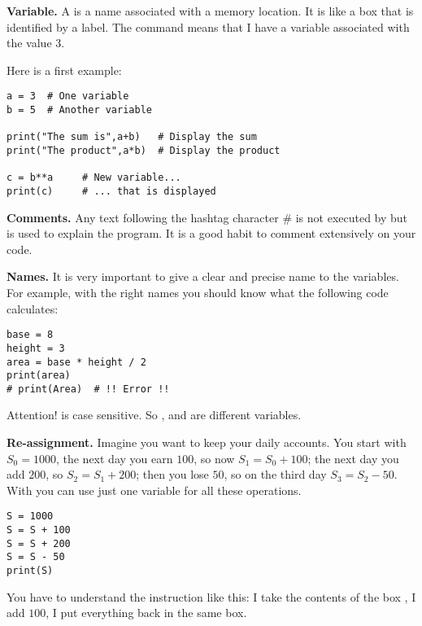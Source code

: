 \documentclass[11pt,class=report,crop=false]{standalone}
\begin{document}

\begin{cours}[Variables]


\textbf{Variable.} 
A  is a name associated with a memory location. It is like a box that is identified by a label.
The command \og{}\fg{} means that I have a variable \og{}\fg{} associated with the value $3$. 

Here is a first example:
\begin{lstlisting}
a = 3  # One variable
b = 5  # Another variable

print("The sum is",a+b)   # Display the sum
print("The product",a*b)  # Display the product

c = b**a     # New variable...
print(c)     # ... that is displayed
\end{lstlisting}


\medskip

\textbf{Comments.}
Any text following the hashtag character \og{}\#\fg{} is not executed by \Python{} but is used to explain the program. It is a good habit to comment extensively on your code.

 
\medskip

\textbf{Names.} 
It is very important to give a clear and precise name to the variables. For example, with the right names you should know what the following code calculates:
\begin{lstlisting}
base = 8
height = 3
area = base * height / 2
print(area)
# print(Area)  # !! Error !!
\end{lstlisting}

Attention! \Python{} is case sensitive. So ,  and  are different variables.

\medskip

\textbf{Re-assignment.} Imagine you want to keep your daily accounts. You start with $S_0 = 1000$, the next day you earn $100$, so now $S_1 = S_0 + 100$; the next day you add $200$, so $S_2 = S_1 + 200$; then you lose $50$, so on the third day $S_3 = S_2 - 50$. With \Python{} you can use just one variable  for all these operations.

\begin{lstlisting}
S = 1000
S = S + 100
S = S + 200
S = S - 50
print(S)
\end{lstlisting}
You have to understand the instruction \og{}\fg{} like this: \og{}I take the contents of the box , I add $100$, I put everything back in the same box\fg{}.
\end{cours}
\end{document}
